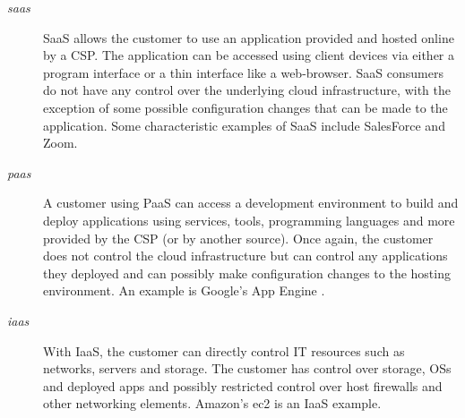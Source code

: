 \begin{description}
    \item [\textit{\ac{saas}}] SaaS allows the customer to use an application provided and hosted online by a CSP. The application can be accessed using client devices via either a program interface or a thin interface like a web-browser. SaaS consumers do not have any control over the underlying cloud infrastructure, with the exception of some possible configuration changes that can be made to the application. Some characteristic examples of SaaS include SalesForce and Zoom. \cite{saleforce,zoom}

    \item [\textit{\ac{paas}}] A customer using PaaS can access a development environment to build and deploy applications using services, tools, programming languages and more provided by the CSP (or by another source). Once again, the customer does not control the cloud infrastructure but can control any applications they deployed and can possibly make configuration changes to the hosting environment. An example is Google's App Engine \cite{appengine}.

    \item [\textit{\ac{iaas}}] With IaaS, the customer can directly control IT resources such as networks, servers and storage. The customer has control over storage, OSs and deployed apps and possibly restricted control over host firewalls and other networking elements. Amazon's \ac{ec2} is an IaaS example. \cite{ec2}
\end{description}


